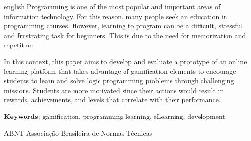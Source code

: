 \documentclass[
	12pt,				%
	oneside,			%
	a4paper,			%
	english,			%
	french,				%
	spanish,			%
	brazil				%
	]{abntex2}
\newcommand{\listasdousuario}{}
\begin{document}

\begin{resumo}[Abstract]
 \begin{otherlanguage*}{english}
   Programming is one of the most popular and important areas of
   information technology. For this reason, many people seek an education
   in programming courses. However, learning to program can be a difficult,
   stressful and frustrating task for beginners. This is due to the need
   for memorization and repetition.
   
   In this context, this paper aims to develop and evaluate a prototype of
   an online learning platform that takes advantage of gamification
   elements to encourage students to learn and solve logic programming
   problems through challenging missions. Students are more motivated since
   their actions would result in rewards, achievements, and levels that
   correlate with their performance.

   \vspace{\onelineskip}
 
   \noindent 
   \textbf{Keywords}: gamification, programming learning, eLearning, development
 \end{otherlanguage*}
\end{resumo}






\listasdousuario

\begin{siglas}
  \item[ABNT] Associação Brasileira de Normas Técnicas
\end{siglas}

\tableofcontents*
\cleardoublepage


\textual
\pagestyle{simple}                  %
\end{document}
